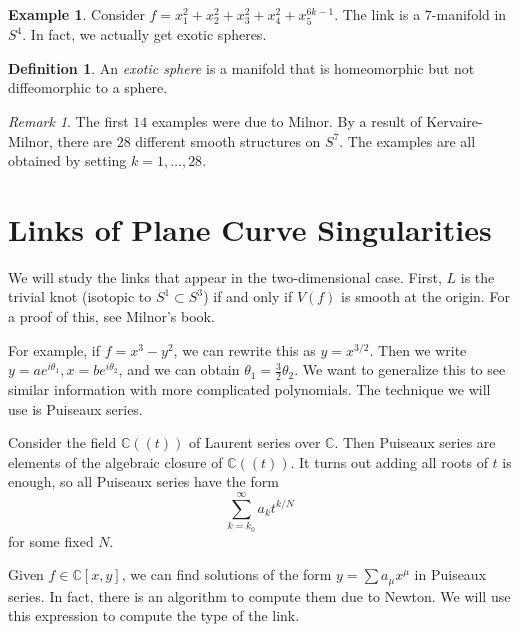 \documentclass[leqno, openany]{memoir}
\theoremstyle{definition}
\newtheorem{defn}[thm]{Definition}
\newtheorem{exm}[thm]{Example}
\theoremstyle{remark}
\newtheorem{rmk}[thm]{Remark}
\theoremstyle{plain}
\theoremstyle{definition}
\theoremstyle{remark}
\newcommand{\C}{\mathbb{C}}
\begin{document}
\begin{exm}
    Consider $f = x_1^2 + x_2^2 + x_3^2 + x_4^2 + x_5^{6k-1}$. The link is a $7$-manifold in $S^4$. In fact, we actually get exotic spheres.
\end{exm}

\begin{defn}
    An \textit{exotic sphere} is a manifold that is homeomorphic but not diffeomorphic to a sphere.
\end{defn}

\begin{rmk}
    The first $14$ examples were due to Milnor. By a result of Kervaire-Milnor, there are $28$ different smooth structures on $S^7$. The examples are all obtained by setting $k = 1, \ldots, 28$.
\end{rmk}

\section{Links of Plane Curve Singularities}%
\label{sec:algebraic_knots_and_links}

We will study the links that appear in the two-dimensional case. First, $L$ is the trivial knot (isotopic to $S^1 \subset S^3$) if and only if $V(f)$ is smooth at the origin. For a proof of this, see Milnor's book.

For example, if $f = x^3 - y^2$, we can rewrite this as $y = x^{3/2}$. Then we write $y = ae^{i\theta_1}, x = be^{i\theta_2}$, and we can obtain $\theta_1 = \frac{3}{2} \theta_2$. We want to generalize this to see similar information with more complicated polynomials. The technique we will use is Puiseaux series.

Consider the field $\C((t))$ of Laurent series over $\C$. Then Puiseaux series are elements of the algebraic closure of $\C((t))$. It turns out adding all roots of $t$ is enough, so all Puiseaux series have the form
\[ \sum_{k = k_0}^{\infty} a_k t^{k/N} \]
for some fixed $N$. 

Given $f \in \C[x,y]$, we can find solutions of the form $y = \sum a_{\mu} x^{\mu}$ in Puiseaux series. In fact, there is an algorithm to compute them due to Newton. We will use this expression to compute the type of the link.
\end{document}
